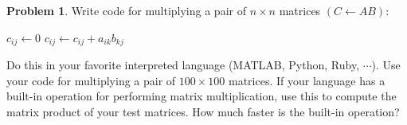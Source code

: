 \documentclass{article}
\theoremstyle{definition}
\newtheorem{problem}{Problem}[subsection]
\begin{document}
	\setcounter{section}{1}
	\setcounter{subsection}{1}
	
	\setcounter{problem}{0}
	\begin{problem}
		Write code for multiplying a pair of \(n \times n\) matrices \((C\gets AB)\):
		\begin{figure*}[h!]
			\centering
			\begin{algorithmic}
				\State \(c_{ij}\gets 0\)
				\State \(c_{ij}\gets c_{ij} + a_{ik}b_{kj}\)
				\EndFor
				\EndFor
				\EndFor
			\end{algorithmic}
		\end{figure*}
	
		\noindent Do this in your favorite interpreted language (MATLAB, Python, Ruby, \(\cdots\)). Use your code for multiplying a pair of \(100\times 100\) matrices. If your language has a built-in operation for performing matrix multiplication, use this to compute the matrix product of your test matrices. How much faster is the built-in operation?
	\end{problem}
\end{document}
